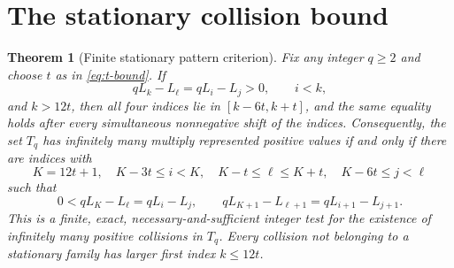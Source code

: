 \documentclass[11pt]{article}
\newtheorem{theorem}{Theorem}[section]
\begin{document}
\section{The stationary collision bound}
\begin{theorem}[Finite stationary pattern criterion]\label{thm:stationary}
Fix any integer $q\ge2$ and choose $t$ as in
\eqref{eq:t-bound}. If
\begin{equation}\label{eq:general-T-collision}
qL_k-L_\ell=qL_i-L_j>0,\qquad i<k,
\end{equation}
and $k>12t$, then all four indices lie in $[k-6t,k+t]$, and the same
equality holds after \emph{every} simultaneous nonnegative
shift of the indices.
Consequently, the set $T_q$ has infinitely many
multiply represented positive values if and only if
there are indices with
\[
K=12t+1,\quad K-3t\le i<K,\quad
K-t\le\ell\le K+t,\quad
K-6t\le j<\ell
\]
such that
\begin{equation}\label{eq:finite-shift-test}
0<qL_K-L_\ell=qL_i-L_j,\qquad
qL_{K+1}-L_{\ell+1}=qL_{i+1}-L_{j+1}.
\end{equation}
This is a finite, exact, necessary-and-sufficient
integer test for the existence of infinitely
many positive collisions in $T_q$.
Every collision not belonging to a stationary
family has larger first index $k\le12t$.
\end{theorem}
\end{document}
